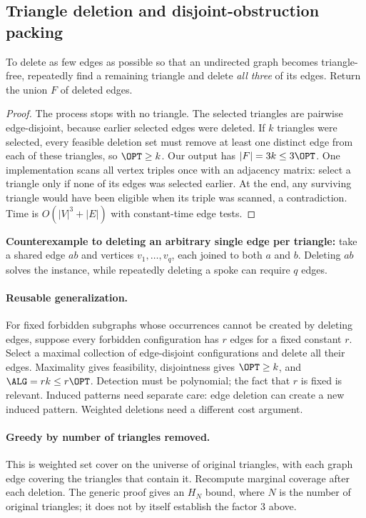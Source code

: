 \subsection{Triangle deletion and disjoint-obstruction packing}
\label{gre:triangles}
To delete as few edges as possible so that an undirected graph becomes triangle-free,
repeatedly find a remaining triangle and delete \emph{all three} of its edges. Return the
union $F$ of deleted edges.
\begin{proof}
The process stops with no triangle. The selected triangles are pairwise edge-disjoint,
because earlier selected edges were deleted. If $k$ triangles were selected, every feasible
deletion set must remove at least one distinct edge from each of these triangles, so
$\OPT\ge k$. Our output has $|F|=3k\le3\OPT$.
One implementation scans all vertex triples once with an adjacency matrix: select a
triangle only if none of its edges was selected earlier. At the end, any surviving triangle
would have been eligible when its triple was scanned, a contradiction. Time is
$O(|V|^3+|E|)$ with constant-time edge tests.
\end{proof}
\textbf{Counterexample to deleting an arbitrary single edge per triangle:}
take a shared edge $ab$ and vertices $v_1,\ldots,v_q$, each joined to both $a$ and $b$.
Deleting $ab$ solves the instance, while repeatedly deleting a spoke can require $q$ edges.

\paragraph{Reusable generalization.}
For fixed forbidden subgraphs whose occurrences cannot be created by deleting edges,
suppose every forbidden configuration has $r$ edges for a fixed constant $r$. Select a maximal
collection of edge-disjoint configurations and delete all their edges. Maximality gives
feasibility, disjointness gives $\OPT\ge k$, and $\ALG=rk\le r\OPT$. Detection must be
polynomial; the fact that $r$ is fixed is relevant. Induced patterns need separate care:
edge deletion can create a new induced pattern. Weighted deletions need a different cost argument.

\paragraph{Greedy by number of triangles removed.}
This is weighted set cover on the universe of original triangles, with each graph edge
covering the triangles that contain it. Recompute marginal coverage after each deletion.
The generic proof gives an $H_N$ bound, where $N$ is the number of original triangles;
it does not by itself establish the factor 3 above.
